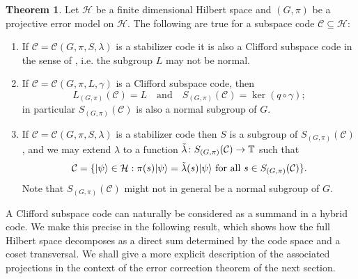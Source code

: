 \documentclass[11pt]{article}
\theoremstyle{definition}
\newtheorem{theorem}{Theorem}
\def\ket#1{| #1 \rangle}
\newcommand{\bbT}{\mathbb{T}}
\newcommand{\calC}{\mathcal{C}}
\newcommand{\calH}{\mathcal{H}}
\begin{document}
\begin{theorem}\label{thm:clifford and stabilizer code facts}
    Let $\calH$ be a finite dimensional Hilbert space and $(G,\pi)$ be a projective error model on $\calH$. The following are true for a subspace code $\calC \subseteq \calH$:
    \begin{enumerate}
        \item If $\calC = \calC(G,\pi,S,\lambda)$ is a stabilizer code it is also a Clifford subspace code in the sense of \cite{Eidesen2025}, i.e. the subgroup $L$ may not be normal.
        \item If $\calC = \calC(G,\pi,L,\gamma)$ is a Clifford subspace code, then
        \[
            L_{(G,\pi)}(\calC)  = L \quad \mathrm{and} \quad 
            S_{(G,\pi)}(\calC)  = \ker(q \circ \gamma);
        \]
        in particular $S_{(G,\pi)}(\calC)$ is also a normal subgroup of $G$.
        \item If $\calC = \calC(G,\pi,S,\lambda)$ is a stabilizer code then $S$ is a subgroup of $S_{(G,\pi)}(\calC)$, and we may extend $\lambda$ to a function $\Tilde{\lambda} \colon S_{(G,\pi)}(\calC) \to \bbT$ such that
        \[
            \calC = \{ \ket{\psi} \in \calH : \pi(s)\ket{\psi} = \Tilde{\lambda}(s)\ket{\psi} \text{ for all } s \in S_{(G,\pi)}(\calC) \}.
        \]
        Note that $S_{(G,\pi)}(\calC)$ might not in general be a normal subgroup of $G$.
    \end{enumerate}
\end{theorem}

A Clifford subspace code can naturally be considered as a summand in a hybrid code. We make this precise in the following result, which shows how the full Hilbert space decomposes as a direct sum determined by the code space and a coset transversal. We shall give a more explicit description of the associated projections in the context of the error correction theorem of the next section. 
\end{document}
